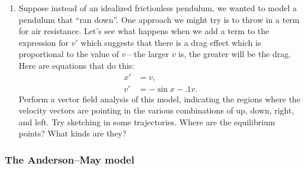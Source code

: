 \begin{enumerate}
\item Suppose instead of an idealized frictionless pendulum, we wanted
to model a pendulum that ``ran down''.  One approach we might try is
to throw in a term for air resistance.  Let's see what happens when we
add a term to the expression for $v'$ which suggests that there is a
drag effect which is proportional to the value of $v$---the larger $v$
is, the greater will be the drag.  Here are equations that do this:
\begin{align*}
x' &= v, \\
v' &= -\sin x-.1v.
\end{align*}
Perform a vector field analysis of this model, indicating the regions
where the velocity vectors are pointing in the various combinations of
up, down, right, and left.  Try sketching in some trajectories.  Where
are the equilibrium points? What kinds are they?



\end{enumerate}
\subsubsection{The Anderson--May model}
\label{subsubsec:the-anderson--may-model}




